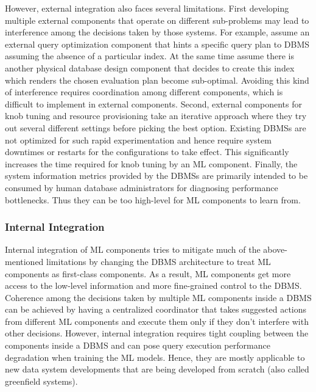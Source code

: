 However, external integration also faces several limitations.
First developing multiple external components that operate on different sub-problems may lead to interference among the decisions taken by those systems.
For example, assume an external query optimization component that hints a specific query plan to DBMS assuming the absence of a particular index.
At the same time assume there is another physical database design component that decides to create this index which renders the chosen evaluation plan become sub-optimal.
Avoiding this kind of interference requires coordination among different components, which is difficult to implement in external components.
Second, external components for knob tuning and resource provisioning take an iterative approach where they try out several different settings before picking the best option.
Existing DBMSs are not optimized for such rapid experimentation and hence require system downtimes or restarts for the configurations to take effect.
This significantly increases the time required for knob tuning by an ML component.
Finally, the system information metrics provided by the DBMSs are primarily intended to be consumed by human database administrators for diagnosing performance bottlenecks.
Thus they can be too high-level for ML components to learn from.

\subsubsection{Internal Integration} 
Internal integration of ML components tries to mitigate much of the above-mentioned limitations by changing the DBMS architecture to treat ML components as first-class components.
As a result, ML components get more access to the low-level information and more fine-grained control to the DBMS.
Coherence among the decisions taken by multiple ML components inside a DBMS can be achieved by having a centralized coordinator that takes suggested actions from different ML components and execute them only if they don't interfere with other decisions.
However, internal integration requires tight coupling between the components inside a DBMS and can pose query execution performance degradation when training the ML models.
Hence, they are mostly applicable to new data system developments that are being developed from scratch (also called greenfield systems).

